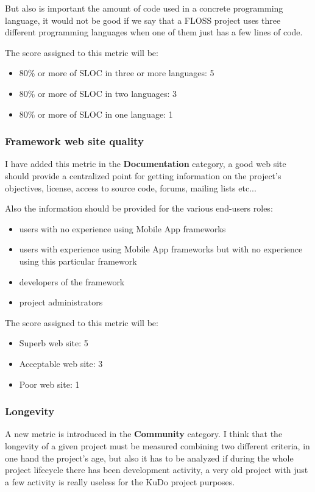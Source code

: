 \documentclass[a4paper,12pt]{book}
\begin{document}
But also is important the amount of code used in a concrete programming language, it would not be good if we say that a FLOSS project uses three different programming languages when one of them just has a few lines of code.

The score assigned to this metric will be:
\begin{itemize}
 \item 80\% or more of SLOC in three or more languages: 5
 \item 80\% or more of SLOC in two languages: 3
 \item 80\% or more of SLOC in one language: 1
\end{itemize}

\subsubsection{Framework web site quality}
\label{Framework web site quality}

I have added this metric in the \textbf{Documentation} category, a good web site should provide a centralized point for getting information on the project's objectives, license, access to source code, forums, mailing lists etc...

Also the information should be provided for the various end-users roles: 
\begin{itemize}
 \item users with no experience using Mobile App frameworks
 \item users with experience using Mobile App frameworks but with no experience using this particular framework
 \item developers of the framework
 \item project administrators
\end{itemize}

The score assigned to this metric will be:
\begin{itemize}
 \item Superb web site: 5
 \item Acceptable web site: 3
 \item Poor web site: 1
\end{itemize}

\subsubsection{Longevity}
\label{Longevity}
A new metric is introduced in the \textbf{Community} category. I think that the longevity of a given project must be measured combining two different criteria, in one hand the project's age, but also it has to be analyzed if during the whole project lifecycle there has been development activity, a very old project with just a few activity is really useless for the KuDo project purposes.
\end{document}
